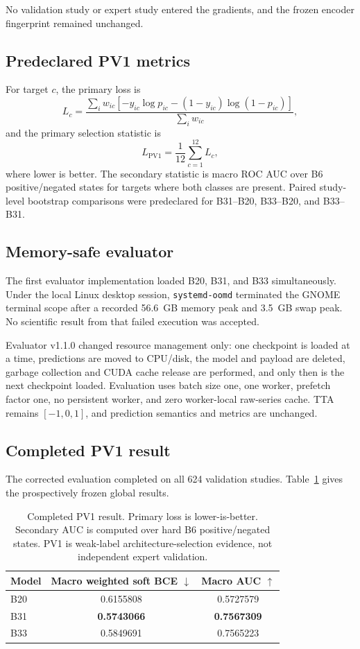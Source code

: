 \documentclass[preprint,12pt]{elsarticle}
\newcommand{\code}[1]{\texttt{#1}}
\begin{document}
No validation study or expert study entered the gradients, and the frozen encoder fingerprint remained unchanged.

\subsection{Predeclared PV1 metrics}
For target $c$, the primary loss is
\begin{equation}
L_c=\frac{\sum_i w_{ic}\left[-y_{ic}\log p_{ic}-(1-y_{ic})\log(1-p_{ic})\right]}
{\sum_i w_{ic}},
\end{equation}
and the primary selection statistic is
\begin{equation}
L_{\mathrm{PV1}}=\frac{1}{12}\sum_{c=1}^{12}L_c,
\end{equation}
where lower is better. The secondary statistic is macro ROC AUC over B6 positive/negated states for targets where both classes are present. Paired study-level bootstrap comparisons were predeclared for B31--B20, B33--B20, and B33--B31.

\subsection{Memory-safe evaluator}
The first evaluator implementation loaded B20, B31, and B33 simultaneously. Under the local Linux desktop session, \code{systemd-oomd} terminated the GNOME terminal scope after a recorded 56.6~GB memory peak and 3.5~GB swap peak. No scientific result from that failed execution was accepted.

Evaluator v1.1.0 changed resource management only: one checkpoint is loaded at a time, predictions are moved to CPU/disk, the model and payload are deleted, garbage collection and CUDA cache release are performed, and only then is the next checkpoint loaded. Evaluation uses batch size one, one worker, prefetch factor one, no persistent worker, and zero worker-local raw-series cache. TTA remains $[-1,0,1]$, and prediction semantics and metrics are unchanged.

\subsection{Completed PV1 result}
The corrected evaluation completed on all 624 validation studies. Table~\ref{tab:pv1result} gives the prospectively frozen global results.

\begin{table}[ht]
\centering
\caption{Completed PV1 result. Primary loss is lower-is-better. Secondary AUC is computed over hard B6 positive/negated states. PV1 is weak-label architecture-selection evidence, not independent expert validation.}
\label{tab:pv1result}
\begin{tabular}{lcc}
\toprule
Model & Macro weighted soft BCE $\downarrow$ & Macro AUC $\uparrow$ \\
\midrule
B20 & 0.6155808 & 0.5727579 \\
B31 & \textbf{0.5743066} & \textbf{0.7567309} \\
B33 & 0.5849691 & 0.7565223 \\
\bottomrule
\end{tabular}
\end{table}
\end{document}
